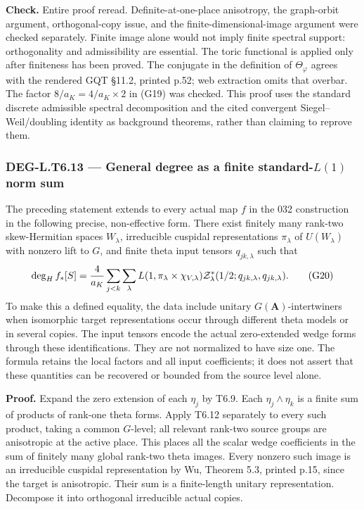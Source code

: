 \textbf{Check.} Entire proof reread. Definite-at-one-place anisotropy, the graph-orbit argument, orthogonal-copy issue, and the finite-dimensional-image argument were checked separately. Finite image alone would not imply finite spectral support: orthogonality and admissibility are essential. The toric functional is applied only after finiteness has been proved. The conjugate in the definition of \(\Theta_\varphi\) agrees with the rendered GQT §11.2, printed p.52; web extraction omits that overbar. The factor \(8/a_K=4/a_K\times2\) in (G19) was checked. This proof uses the standard discrete admissible spectral decomposition and the cited convergent Siegel--Weil/doubling identity as background theorems, rather than claiming to reprove them.

\subsubsection{\texorpdfstring{DEG-L.T6.13 --- General degree as a finite standard-\(L(1)\) norm sum}{DEG-L.T6.13 --- General degree as a finite standard-L(1) norm sum}}\label{DEG-L.T6.13}

The preceding statement extends to every actual map \(f\) in the 032 construction in the following precise, non-effective form. There exist finitely many rank-two skew-Hermitian spaces \(W_\lambda\), irreducible cuspidal representations \(\pi_\lambda\) of \(U(W_\lambda)\) with nonzero lift to \(G\), and finite theta input tensors \(q_{jk,\lambda}\) such that \[
\deg_H f_*[S]
={4\over a_K}\sum_{j<k}\sum_\lambda
 L(1,\pi_\lambda\times\chi_{V,\lambda})
 \mathcal Z^*_{\lambda}(1/2;q_{jk,\lambda},q_{jk,\lambda}).
\tag{G20}
\] To make this a defined equality, the data include unitary \(G(\mathbf A)\)-intertwiners when isomorphic target representations occur through different theta models or in several copies. The input tensors encode the actual zero-extended wedge forms through these identifications. They are not normalized to have size one. The formula retains the local factors and all input coefficients; it does not assert that these quantities can be recovered or bounded from the source level alone.

\textbf{Proof.} Expand the zero extension of each \(\eta_j\) by T6.9. Each \(\eta_j\wedge\eta_k\) is a finite sum of products of rank-one theta forms. Apply T6.12 separately to every such product, taking a common \(G\)-level; all relevant rank-two source groups are anisotropic at the active place. This places all the scalar wedge coefficients in the sum of finitely many global rank-two theta images. Every nonzero such image is an irreducible cuspidal representation by Wu, Theorem 5.3, printed p.15, since the target is anisotropic. Their sum is a finite-length unitary representation. Decompose it into orthogonal irreducible actual copies.

